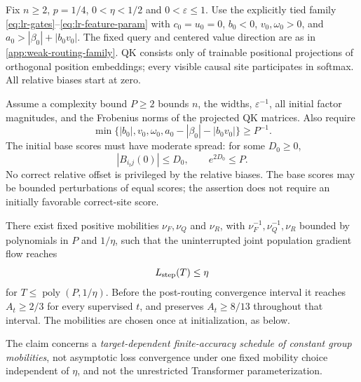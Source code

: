 \begin{lrtheorem}
\label{thm:lr-conditional-bridge}
Fix $n\ge2$, $p=1/4$, $0<\eta<1/2$ and $0<\varepsilon\le1$.
Use the explicitly tied family \eqref{eq:lr-gates}--\eqref{eq:lr-feature-param}
with $c_0=u_0=0$, $b_0<0$, $v_0,\omega_0>0$, and
$a_0>|\beta_0|+|b_0v_0|$. The fixed query and centered value direction
are as in \cref{app:weak-routing-family}. QK consists only of trainable
positional projections of orthogonal position embeddings; every visible
causal site participates in softmax. All relative biases start at zero.

Assume a complexity bound $P\ge2$ bounds $n$, the widths,
$\varepsilon^{-1}$, all initial factor magnitudes, and the Frobenius norms
of the projected QK matrices. Also require
\[
 \min\{|b_0|,v_0,\omega_0,a_0-|\beta_0|-|b_0v_0|\}\ge P^{-1}.
\]
The initial base scores must have moderate spread: for some $D_0\ge0$,
\[
 |B_{i_tj}(0)|\le D_0,\qquad e^{2D_0}\le P.
\]
No correct relative offset is privileged by the relative biases. The base
scores may be bounded perturbations of equal scores; the assertion does
not require an initially favorable correct-site score.

There exist fixed positive mobilities $\nu_F,\nu_Q$ and $\nu_R$, with
$\nu_F^{-1},\nu_Q^{-1},\nu_R$ bounded by polynomials in $P$ and $1/\eta$,
such that the uninterrupted joint population gradient flow reaches
\begin{equation}\label{eq:lr-finite-theorem}
 L_{\mathrm{step}}(T)\le\eta
\end{equation}
for $T\le\operatorname{poly}(P,1/\eta)$.
Before the post-routing convergence interval it reaches $A_t\ge2/3$
for every supervised $t$, and preserves $A_t\ge8/13$ throughout that
interval. The mobilities are chosen once at initialization, as below.

The claim concerns a \emph{target-dependent finite-accuracy schedule of
constant group mobilities}, not asymptotic loss convergence under one
fixed mobility choice independent of $\eta$, and not the unrestricted
Transformer parameterization.
\end{lrtheorem}
